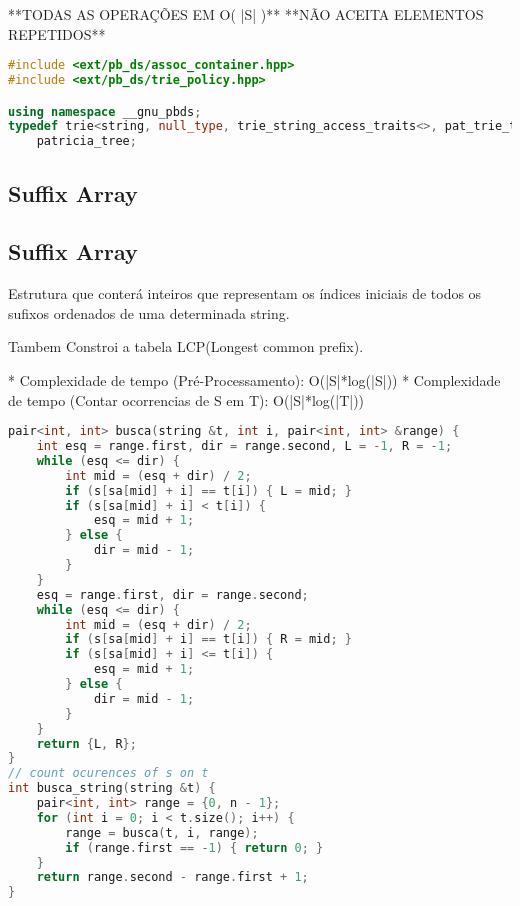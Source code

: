 \documentclass[11pt, a4paper, twoside]{article}
\begin{document}
**TODAS AS OPERAÇÕES EM O( |S| )**  
**NÃO ACEITA ELEMENTOS REPETIDOS**

\begin{lstlisting}[language=C++]
#include <ext/pb_ds/assoc_container.hpp>
#include <ext/pb_ds/trie_policy.hpp>

using namespace __gnu_pbds;
typedef trie<string, null_type, trie_string_access_traits<>, pat_trie_tag, trie_prefix_search_node_update>
    patricia_tree;
\end{lstlisting}

\subsection{Suffix Array}

\subsection{Suffix Array}



Estrutura que conterá inteiros que representam os índices iniciais de todos os sufixos ordenados de uma determinada string.

Tambem Constroi a tabela LCP(Longest common prefix).

* Complexidade de tempo (Pré-Processamento): O(|S|*log(|S|))
* Complexidade de tempo (Contar ocorrencias de S em T): O(|S|*log(|T|))
\begin{lstlisting}[language=C++]
pair<int, int> busca(string &t, int i, pair<int, int> &range) {
    int esq = range.first, dir = range.second, L = -1, R = -1;
    while (esq <= dir) {
        int mid = (esq + dir) / 2;
        if (s[sa[mid] + i] == t[i]) { L = mid; }
        if (s[sa[mid] + i] < t[i]) {
            esq = mid + 1;
        } else {
            dir = mid - 1;
        }
    }
    esq = range.first, dir = range.second;
    while (esq <= dir) {
        int mid = (esq + dir) / 2;
        if (s[sa[mid] + i] == t[i]) { R = mid; }
        if (s[sa[mid] + i] <= t[i]) {
            esq = mid + 1;
        } else {
            dir = mid - 1;
        }
    }
    return {L, R};
}
// count ocurences of s on t
int busca_string(string &t) {
    pair<int, int> range = {0, n - 1};
    for (int i = 0; i < t.size(); i++) {
        range = busca(t, i, range);
        if (range.first == -1) { return 0; }
    }
    return range.second - range.first + 1;
}\end{lstlisting}
\end{document}
